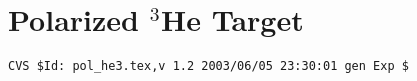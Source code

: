 \section{Polarized $^3$He Target}
%
%
{\small
\begin{verbatim}CVS $Id: pol_he3.tex,v 1.2 2003/06/05 23:30:01 gen Exp $\end{verbatim}
}
